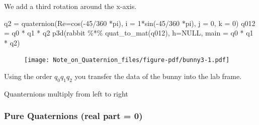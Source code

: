 \documentclass[
  letterpaper,
  DIV=11,
  numbers=noendperiod]{scrartcl}
\newenvironment{Shaded}{\begin{snugshade}}{\end{snugshade}}
\newcommand{\AttributeTok}[1]{\textcolor[rgb]{0.40,0.45,0.13}{#1}}
\newcommand{\ConstantTok}[1]{\textcolor[rgb]{0.56,0.35,0.01}{#1}}
\newcommand{\DecValTok}[1]{\textcolor[rgb]{0.68,0.00,0.00}{#1}}
\newcommand{\FunctionTok}[1]{\textcolor[rgb]{0.28,0.35,0.67}{#1}}
\newcommand{\NormalTok}[1]{\textcolor[rgb]{0.00,0.23,0.31}{#1}}
\newcommand{\OtherTok}[1]{\textcolor[rgb]{0.00,0.23,0.31}{#1}}
\newcommand{\SpecialCharTok}[1]{\textcolor[rgb]{0.37,0.37,0.37}{#1}}
\newcommand{\StringTok}[1]{\textcolor[rgb]{0.13,0.47,0.30}{#1}}
\begin{document}
We add a third rotation around the x-axis.

\begin{Shaded}
\begin{Highlighting}[]
\NormalTok{  q2 }\OtherTok{=} \FunctionTok{quaternion}\NormalTok{(}\AttributeTok{Re=}\FunctionTok{cos}\NormalTok{(}\SpecialCharTok{{-}}\DecValTok{45}\SpecialCharTok{/}\DecValTok{360} \SpecialCharTok{*}\NormalTok{pi), }\AttributeTok{i =} \DecValTok{1}\SpecialCharTok{*}\FunctionTok{sin}\NormalTok{(}\SpecialCharTok{{-}}\DecValTok{45}\SpecialCharTok{/}\DecValTok{360} \SpecialCharTok{*}\NormalTok{pi), }\AttributeTok{j =} \DecValTok{0}\NormalTok{, }\AttributeTok{k =} \DecValTok{0}\NormalTok{) }
\NormalTok{  q012 }\OtherTok{=}\NormalTok{ q0 }\SpecialCharTok{*}\NormalTok{ q1 }\SpecialCharTok{*}\NormalTok{ q2 }
  \FunctionTok{p3d}\NormalTok{(rabbit }\SpecialCharTok{\%*\%} \FunctionTok{quat\_to\_mat}\NormalTok{(q012), }\AttributeTok{h=}\ConstantTok{NULL}\NormalTok{, }\AttributeTok{main =} \StringTok{\textquotesingle{}q0 * q1 * q2\textquotesingle{}}\NormalTok{)}
\end{Highlighting}
\end{Shaded}

\begin{figure}[H]

{\centering \texttt{[image: Note\_on\_Quaternion\_files/figure-pdf/bunny3-1.pdf]}

}

\end{figure}

Using the order \(q_0 q_1 q_2\) you transfer the data of the bunny into
the lab frame.

\begin{tcolorbox}[enhanced jigsaw, opacitybacktitle=0.6, rightrule=.15mm, breakable, bottomtitle=1mm, arc=.35mm, colframe=quarto-callout-important-color-frame, coltitle=black, leftrule=.75mm, title=\textcolor{quarto-callout-important-color}{\faExclamation}\hspace{0.5em}{Important}, left=2mm, toptitle=1mm, colbacktitle=quarto-callout-important-color!10!white, titlerule=0mm, colback=white, bottomrule=.15mm, toprule=.15mm, opacityback=0]
Quanternions multiply from left to right
\end{tcolorbox}

\hypertarget{pure-quaternions-real-part-0}{%
\subsubsection{Pure Quaternions (real part =
0)}\label{pure-quaternions-real-part-0}}
\end{document}
